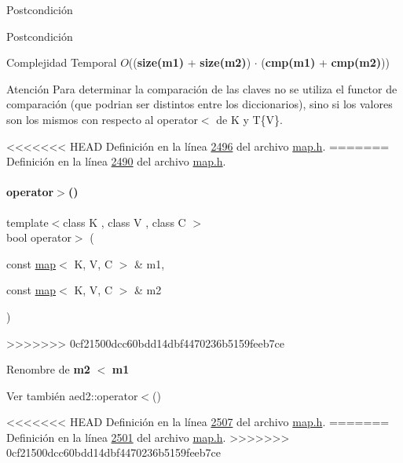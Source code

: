 \begin{DoxyPostcond}{\-Postcondición}
\begin{DoxyPostcond}{\-Postcondición}
\begin{DoxyDescription}
\item[Complejidad Temporal]$O$(({\bfseries size(m1)} + {\bfseries size(m2)}) $\cdot$ ({\bfseries cmp(m1)} + {\bfseries cmp(m2)}))
\end{DoxyDescription}

\begin{DoxyAttention}{Atención}
Para determinar la comparación de las claves no se utiliza el functor de comparación (que podrian ser distintos entre los diccionarios), sino si los valores son los mismos con respecto al operator$<$ de K y T\{V\}. 
\end{DoxyAttention}


<<<<<<< HEAD
\-Definición en la línea \hyperlink{map_8h_source_l02496}{2496} del archivo \hyperlink{map_8h_source}{map.\-h}.
=======
Definición en la línea \hyperlink{map_8h_source_l02490}{2490} del archivo \hyperlink{map_8h_source}{map.\+h}.

\mbox{\label{classaed2_1_1map_a2000cd874b72034ce7fe730c811b6c63_a2000cd874b72034ce7fe730c811b6c63}} 
\paragraph{\texorpdfstring{operator$>$()}{operator>()}}
{\footnotesize\ttfamily template$<$class K , class V , class C $>$ \\
bool operator$>$ (\begin{DoxyParamCaption}\item[{const \hyperlink{classaed2_1_1map}{map}$<$ K, V, C $>$ \&}]{m1,  }\item[{const \hyperlink{classaed2_1_1map}{map}$<$ K, V, C $>$ \&}]{m2 }\end{DoxyParamCaption})\hspace{0.3cm}{\ttfamily [related]}}
>>>>>>> 0cf21500dcc60bdd14dbf4470236b5159feeb7ce



Renombre de {\bfseries m2} $<$ {\bfseries m1} 

\begin{DoxySeeAlso}{Ver también}
aed2\+::operator$<$() 
\end{DoxySeeAlso}


<<<<<<< HEAD
\-Definición en la línea \hyperlink{map_8h_source_l02507}{2507} del archivo \hyperlink{map_8h_source}{map.\-h}.
=======
Definición en la línea \hyperlink{map_8h_source_l02501}{2501} del archivo \hyperlink{map_8h_source}{map.\+h}.
>>>>>>> 0cf21500dcc60bdd14dbf4470236b5159feeb7ce


\end{DoxyPostcond}
\end{DoxyPostcond}
